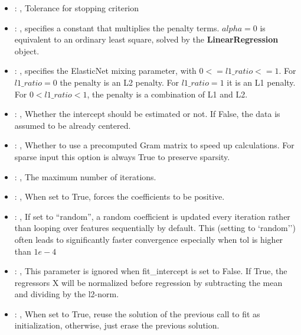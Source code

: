 \begin{itemize}
    \item {}: , 
      Tolerance for stopping criterion

    \item {}: , 
      specifies a constant                                                  that multiplies the
      penalty terms.                                                  $alpha = 0$ is equivalent to
      an ordinary least square, solved by the
      \textbf{LinearRegression} object.

    \item {}: , 
      specifies the                                                  ElasticNet mixing parameter,
      with $0 <= l1\_ratio <= 1$.                                                  For $l1\_ratio =
      0$ the penalty is an L2 penalty.                                                  For
      $l1\_ratio = 1$ it is an L1 penalty.                                                  For $0 <
      l1\_ratio < 1$, the penalty is a combination of L1 and L2.

    \item {}: , 
      Whether the intercept should be estimated or not. If False,
      the data is assumed to be already centered.

    \item {}: , 
      Whether to use a precomputed Gram matrix to speed up calculations.
      For sparse input this option is always True to preserve sparsity.

    \item {}: , 
      The maximum number of iterations.

    \item {}: , 
      When set to True, forces the coefficients to be positive.

    \item {}: , 
      If set to ``random'', a random coefficient is updated every iteration
      rather than looping over features sequentially by default. This (setting to `random'')
      often leads to significantly faster convergence especially when tol is higher than $1e-4$

    \item {}: , 
      This parameter is ignored when fit\_intercept is set to False. If True,
      the regressors X will be normalized before regression by subtracting the mean and
      dividing by the l2-norm.

    \item {}: , 
      When set to True, reuse the solution of the previous call
      to fit as initialization, otherwise, just erase the previous solution.
  \end{itemize}


